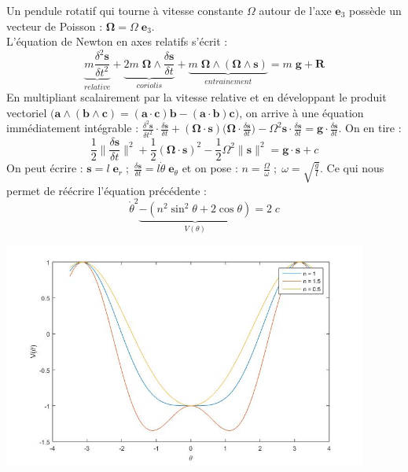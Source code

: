\documentclass[a4paper]{article}
\begin{document}
\begin{itemize}
Un pendule rotatif qui tourne à vitesse constante $ \Omega $ autour de l'axe $ \textbf{e}_3 $ possède un vecteur de Poisson : $ \boldsymbol{\Omega} = \Omega \; \textbf{e}_3 $. \\
L'équation de Newton en axes relatifs s'écrit : 
\[ \underbrace{m \frac{\delta^2 \textbf{s}}{\delta t^2}}_{relative} + \underbrace{2 m \; \boldsymbol{\Omega} \wedge \frac{\delta \textbf{s}}{\delta t}}_{coriolis} + \underbrace{m \; \boldsymbol{\Omega} \wedge (\boldsymbol{\Omega \wedge \textbf{s}})}_{entrainement} = m \; \textbf{g} + \textbf{R} \]
En multipliant scalairement par la vitesse relative  et en développant le produit vectoriel $ \big( \textbf{a} \wedge (\textbf{b} \wedge \textbf{c}) = (\textbf{a} \cdot \textbf{c}) \textbf{b} - (\textbf{a} \cdot \textbf{b}) \textbf{c} \big) $, on arrive à une équation immédiatement intégrable : $\displaystyle \frac{\delta^2 \textbf{s}}{\delta t^2} \cdot \frac{\delta \textbf{s}}{\delta t} + (\boldsymbol{\Omega} \cdot \textbf{s}) \Big( \boldsymbol{\Omega} \cdot \frac{\delta \textbf{s}}{\delta t} \Big) - \Omega^2 \textbf{s} \cdot \frac{\delta \textbf{s}}{\delta t} = \textbf{g} \cdot \frac{\delta \textbf{s}}{\delta t} $.
On en tire : 
\[ \frac{1}{2} \Big\| \frac{\delta \textbf{s}}{\delta t} \Big\|^2 + \frac{1}{2} (\boldsymbol{\Omega} \cdot \textbf{s})^2 - \frac{1}{2} \Omega^2 \| \textbf{s} \|^2 = \textbf{g} \cdot \textbf{s} + c \]
On peut écrire : $\displaystyle \textbf{s} = l \; \textbf{e}_r \; ; \; \frac{\delta \textbf{s}}{\delta t} = l \dot{\theta} \; \textbf{e}_\theta $ et on pose : $\displaystyle n = \frac{\Omega}{\omega} \; ; \; \omega = \sqrt{\frac{g}{l}} $. Ce qui nous permet de réécrire l'équation précédente : 
\[ \mathring{\theta}^2 \underbrace{- (n^2 \sin^2 \theta + 2 \cos \theta)}_{V(\theta)} = 2 \; c \]

\begin{center}
    \includegraphics[width=0.9\textwidth]{images/pendule_rotatif.jpg}
\end{center}






\end{itemize}
\end{document}
